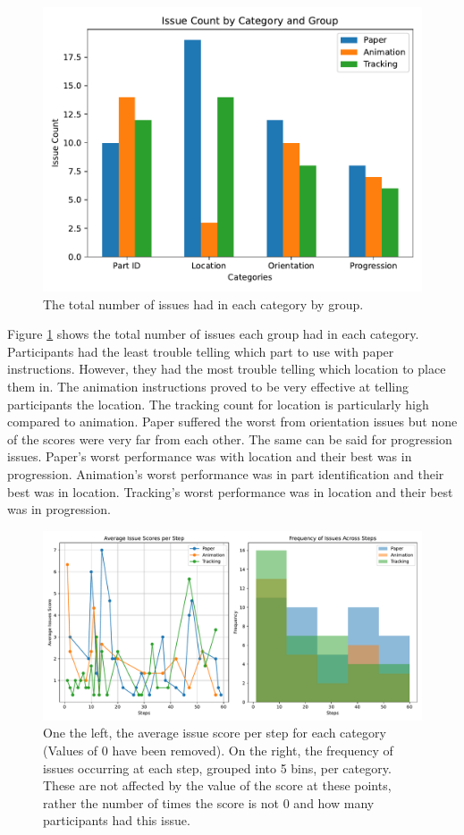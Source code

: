 \documentclass{l4proj}
\begin{document}
\begin{figure}[hbt!]
    \centering
    \includegraphics[width=0.75\linewidth]{dissertation//images/issuesPerCategory.pdf}
    \caption{The total number of issues had in each category by group.}
    \label{fig:issuesPerCategory}
\end{figure}

Figure \ref{fig:issuesPerCategory} shows the total number of issues each group had in each category. Participants had the least trouble telling which part to use with paper instructions. However, they had the most trouble telling which location to place them in. The animation instructions proved to be very effective at telling participants the location. The tracking count for location is particularly high compared to animation. Paper suffered the worst from orientation issues but none of the scores were very far from each other. The same can be said for progression issues. Paper's worst performance was with location and their best was in progression. Animation's worst performance was in part identification and their best was in location. Tracking's worst performance was in location and their best was in progression.

\begin{figure}[hbt!]
    \centering
    \includegraphics[width=0.9\linewidth]{dissertation//images/scoresPerStep.pdf}
    \caption{One the left, the average issue score per step for each category (Values of 0 have been removed). On the right, the frequency of issues occurring at each step, grouped into 5 bins, per category. These are not affected by the value of the score at these points, rather the number of times the score is not 0 and how many participants had this issue.}
    \label{fig:stepScores}
\end{figure}
\end{document}
